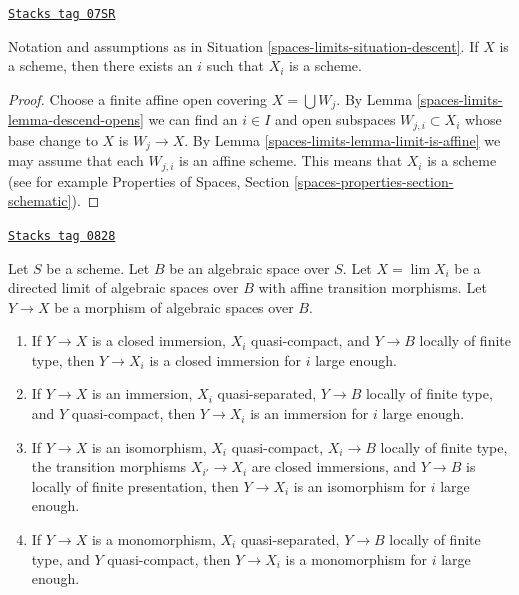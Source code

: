 \begin{lemma}
\label{spaces-limits-lemma-limit-is-scheme}
\href{https://stacks.math.columbia.edu/tag/07SR}{\texttt{Stacks tag 07SR}}

Notation and assumptions as in Situation \ref{spaces-limits-situation-descent}.
If $X$ is a scheme, then there exists an $i$ such that $X_i$ is a scheme.
\end{lemma}

\begin{proof}
Choose a finite affine open covering $X = \bigcup W_j$.
By Lemma \ref{spaces-limits-lemma-descend-opens}
we can find an $i \in I$ and open subspaces $W_{j, i} \subset X_i$
whose base change to $X$ is $W_j \to X$. By
Lemma \ref{spaces-limits-lemma-limit-is-affine} we may assume that
each $W_{j, i}$ is an affine scheme. This means that $X_i$
is a scheme (see for example
Properties of Spaces, Section \ref{spaces-properties-section-schematic}).
\end{proof}

\begin{lemma}
\label{spaces-limits-lemma-finite-type-eventually-closed}
\href{https://stacks.math.columbia.edu/tag/0828}{\texttt{Stacks tag 0828}}

Let $S$ be a scheme. Let $B$ be an algebraic space over $S$.
Let $X = \lim X_i$ be a directed limit of
algebraic spaces over $B$ with affine transition morphisms.
Let $Y \to X$ be a morphism of algebraic spaces over $B$.
\begin{enumerate}
\item If $Y \to X$ is a closed immersion, $X_i$ quasi-compact, and
$Y \to B$ locally of finite type, then $Y \to X_i$ is a closed immersion
for $i$ large enough.
\item If $Y \to X$ is an immersion, $X_i$ quasi-separated, $Y \to B$
locally of finite type, and $Y$ quasi-compact, then $Y \to X_i$ is an
immersion for $i$ large enough.
\item If $Y \to X$ is an isomorphism, $X_i$ quasi-compact,
$X_i \to B$ locally of finite type, the transition morphisms
$X_{i'} \to X_i$ are closed immersions, and $Y \to B$ is locally
of finite presentation, then $Y \to X_i$ is an isomorphism for $i$
large enough.
\item If $Y \to X$ is a monomorphism, $X_i$ quasi-separated,
$Y \to B$ locally of finite type, and $Y$ quasi-compact, then
$Y \to X_i$ is a monomorphism for $i$ large enough.
\end{enumerate}
\end{lemma}

